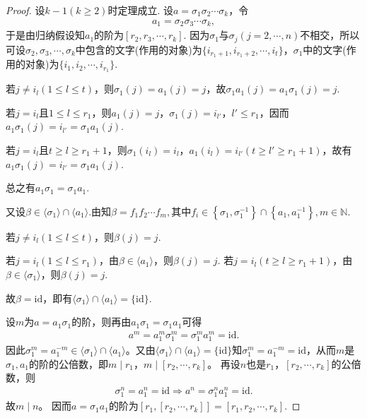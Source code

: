 \documentclass[../../main.tex]{subfiles}%
\begin{document}
\begin{proof}
设$k - 1(k \geqslant 2)$时定理成立. 设$a = \sigma_1 \sigma_2 \cdots \sigma_k$，令
\begin{align*}
a_1 = \sigma_2 \sigma_3 \cdots \sigma_k,
\end{align*}
于是由归纳假设知$a_1$的阶为$[r_2, r_3, \cdots, r_k]$. 因为$\sigma_1$与$\sigma_j(j=2,\cdots,n)$不相交，所以可设$\sigma_2, \sigma_3, \cdots, \sigma_k$中包含的文字(作用的对象)为$\{i_{r_1+1}, i_{r_1+2}, \cdots, i_t\}$，$\sigma_1$中的文字(作用的对象)为$\{i_1, i_2, \cdots, i_{r_1}\}$. 

若$j \neq i_l(1 \leqslant l \leqslant t)$，则$\sigma_1(j) = a_1(j) = j$，故$\sigma_1 a_1(j) = a_1 \sigma_1(j) = j$. 

若$j = i_l$且$1 \leqslant l \leqslant r_1$，则$a_1(j) = j$，$\sigma_1(j) = i_{l'}$，$l' \leqslant r_1$，因而$a_1 \sigma_1(j) = i_{l'} = \sigma_1 a_1(j)$.

若$j = i_l$且$t \geqslant l \geqslant r_1 + 1$，则$\sigma_1(i_l) = i_l$，$a_1(i_l) = i_{l'}(t \geqslant l' \geqslant r_1 + 1)$，故有$a_1 \sigma_1(j) = i_{l'} = \sigma_1 a_1(j)$. 

总之有$a_1 \sigma_1 = \sigma_1 a_1$. 

又设$\beta \in \langle \sigma_1 \rangle \cap \langle a_1 \rangle$.由知$\beta= f_1f_2\cdots f_m,\text{其中}f_i\in \left\{ \sigma _1,\sigma _{1}^{-1} \right\} \cap \left\{ a_1,a_{1}^{-1} \right\} ,m\in \mathbb{N}$. 

若$j \neq i_l(1 \leqslant l \leqslant t)$，则$\beta(j) = j$. 

若$j = i_l(1 \leqslant l \leqslant r_1)$，由$\beta \in \langle a_1 \rangle$，则$\beta(j) = j$. 若$j = i_l(t \geqslant l \geqslant r_1 + 1)$，由$\beta \in \langle \sigma_1 \rangle$，则$\beta(j) = j$.

故$\beta = \text{id}$，即有$\langle \sigma_1 \rangle \cap \langle a_1 \rangle = \{\text{id}\}$.

设$m$为$a=a_1\sigma_1$的阶，则再由$a_1\sigma_1=\sigma_1a_1$可得
\begin{align*}
a^m=a_1^m\sigma_1^m=\sigma_1^m a_1^m=\mathrm{id}.
\end{align*}
因此$\sigma_1^m=a_1^{-m}\in \langle \sigma_1\rangle \cap \langle a_1\rangle$。又由$\langle \sigma_1\rangle \cap \langle a_1\rangle =\{\mathrm{id}\}$知$\sigma_1^m=a_1^{-m}=\mathrm{id}$，从而$m$是$\sigma_1,a_1$的阶的公倍数，即$m\mid r_1$，$m\mid [r_2,\cdots,r_k]$。
再设$n$也是$r_1$，$[r_2,\cdots,r_k]$的公倍数，则
\begin{align*}
\sigma_1^n=a_1^n=\mathrm{id}\Longrightarrow a^n=\sigma_1^n a_1^n=\mathrm{id}.
\end{align*}
故$m\mid n$。
因而$a = \sigma_1 a_1$的阶为$[r_1, [r_2, \cdots, r_k]] = [r_1, r_2, \cdots, r_k]$.
\end{proof}
\end{document}
